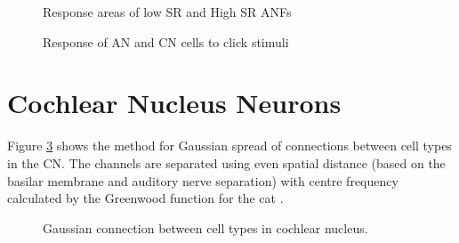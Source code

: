\begin{figure}[tbp]
  \begin{center}
    \caption{Response areas of low SR and High SR ANFs }
    \label{fig:CochlearTTCs}
  \end{center}
\end{figure}


\begin{figure}[tbh]
  \begin{center}


    \caption{Response of AN and CN cells to click stimuli }
    \label{fig:ClickDelayAN}
  \end{center}
\end{figure}


\section{Cochlear Nucleus Neurons}

Figure \ref{fig:CNconn} shows the method for Gaussian spread of
connections between cell types in the CN.  The channels are separated
using even spatial distance (based on the basilar membrane and
auditory nerve separation) with centre frequency calculated by the
Greenwood function for the cat \citep{Greenwood:1990}.


\begin{figure}[tbh]
  \begin{center}
    \resizebox{5in}{!}{%
    }
    \caption{Gaussian connection between cell types in cochlear
      nucleus. }
    \label{fig:CNconn}
  \end{center}
\end{figure}






